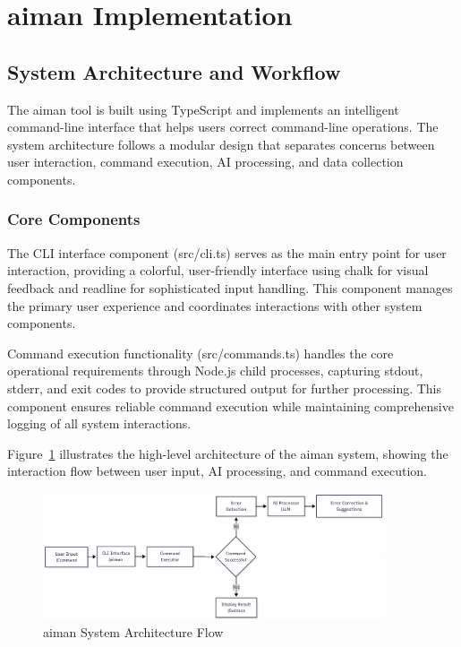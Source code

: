 \section{aiman Implementation}

\subsection{System Architecture and Workflow}

The aiman tool is built using TypeScript and implements an intelligent command-line interface that helps users correct command-line operations. The system architecture follows a modular design that separates concerns between user interaction, command execution, AI processing, and data collection components.

\subsubsection{Core Components}

The CLI interface component (src/cli.ts) serves as the main entry point for user interaction, providing a colorful, user-friendly interface using chalk for visual feedback and readline for sophisticated input handling. This component manages the primary user experience and coordinates interactions with other system components.

Command execution functionality (src/commands.ts) handles the core operational requirements through Node.js child processes, capturing stdout, stderr, and exit codes to provide structured output for further processing. This component ensures reliable command execution while maintaining comprehensive logging of all system interactions.

Figure~\ref{fig:system_architecture} illustrates the high-level architecture of the aiman system, showing the interaction flow between user input, AI processing, and command execution.

\begin{figure}[h]
	\centering
	\includegraphics[width=0.9\textwidth]{assets/figures/system_architecture.pdf}
	\caption{aiman System Architecture Flow}
	\label{fig:system_architecture}
\end{figure}

